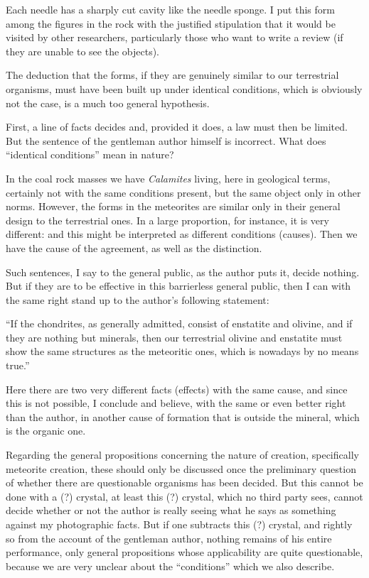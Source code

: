 \documentclass[a4paper, 12pt, oneside]{article}
\begin{document}
Each needle has a sharply cut cavity like the needle sponge. I put this form among the figures in the rock with the justified stipulation that it would be visited by other researchers, particularly those who want to write a review (if they are unable to see the objects).

The deduction that the forms, if they are genuinely similar to our terrestrial organisms, must have been built up under identical conditions, which is obviously not the case, is a much too general hypothesis.

First, a line of facts decides and, provided it does, a law must then be limited. But the sentence of the gentleman author himself is incorrect. What does ``identical conditions'' mean in nature?

In the coal rock masses we have \emph{Calamites} living, here in geological terms, certainly not with the same conditions present, but the same object only in other norms. However, the forms in the meteorites are similar only in their general design to the terrestrial ones. In a large proportion, for instance, it is very different: and this might be interpreted as different conditions (causes). Then we have the cause of the agreement, as well as the distinction.

Such sentences, I say to the general public, as the author puts it, decide nothing. But if they are to be effective in this barrierless general public, then I can with the same right stand up to the author's following statement:

``If the chondrites, as generally admitted, consist of enstatite and olivine, and if they are nothing but minerals, then our terrestrial olivine and enstatite must show the same structures as the meteoritic ones, which is nowadays by no means true.''

Here there are two very different facts (effects) with the same cause, and since this is not possible, I conclude and believe, with the same or even better right than the author, in another cause of formation that is outside the mineral, which is the organic one.

Regarding the general propositions concerning the nature of creation, specifically meteorite creation, these should only be discussed once the preliminary question of whether there are questionable organisms has been decided. But this cannot be done with a (?) crystal, at least this (?) crystal, which no third party sees, cannot decide whether or not the author is really seeing what he says as something against my photographic facts. But if one subtracts this (?) crystal, and rightly so from the account of the gentleman author, nothing remains of his entire performance, only general propositions whose applicability are quite questionable, because we are very unclear about the ``conditions'' which we also describe.
\end{document}
